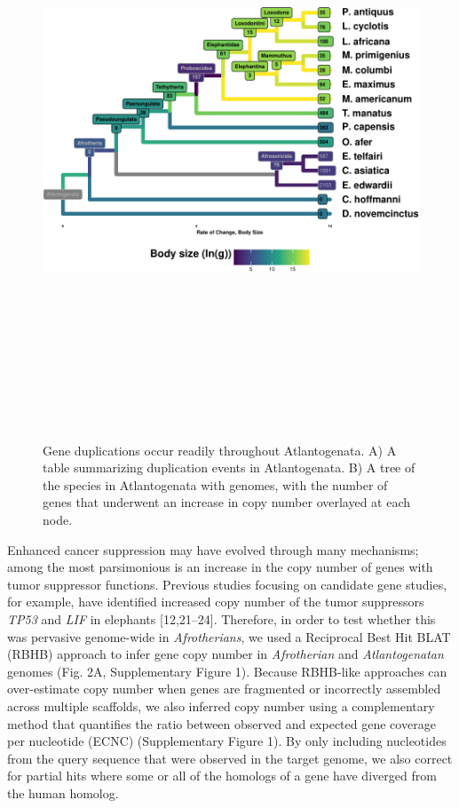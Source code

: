 \documentclass[]{elsarticle} %
\begin{document}
\begin{figure}

\includegraphics[width=6in,height=7in]{paper_PLOS_draft_files/figure-latex/Figure3-1} \hfill{}

\caption{Gene duplications occur readily throughout Atlantogenata. A) A table summarizing duplication events in Atlantogenata. B) A tree of the species in Atlantogenata with genomes, with the number of genes that underwent an increase in copy number overlayed at each node.}\label{fig:Figure3}
\end{figure}

Enhanced cancer suppression may have evolved through many mechanisms;
among the most parsimonious is an increase in the copy number of genes
with tumor suppressor functions. Previous studies focusing on candidate
gene studies, for example, have identified increased copy number of the
tumor suppressors \emph{TP53} and \emph{LIF} in elephants
{[}12,21--24{]}. Therefore, in order to test whether this was pervasive
genome-wide in \emph{Afrotherians}, we used a Reciprocal Best Hit BLAT
(RBHB) approach to infer gene copy number in \emph{Afrotherian} and
\emph{Atlantogenatan} genomes (Fig. 2A, Supplementary Figure 1). Because
RBHB-like approaches can over-estimate copy number when genes are
fragmented or incorrectly assembled across multiple scaffolds, we also
inferred copy number using a complementary method that quantifies the
ratio between observed and expected gene coverage per nucleotide (ECNC)
(Supplementary Figure 1). By only including nucleotides from the query
sequence that were observed in the target genome, we also correct for
partial hits where some or all of the homologs of a gene have diverged
from the human homolog.
\end{document}
